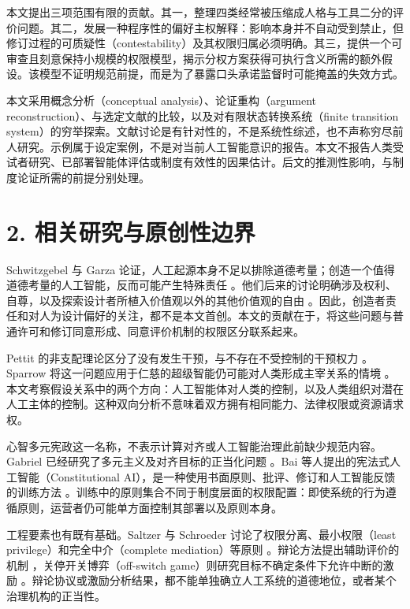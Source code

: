 \documentclass[11pt,a4paper,fontset=fandol]{ctexart}
\begin{document}
本文提出三项范围有限的贡献。其一，整理四类经常被压缩成人格与工具二分的评价问题。其二，发展一种程序性的偏好主权解释：影响本身并不自动受到禁止，但修订过程的可质疑性（contestability）及其权限归属必须明确。其三，提供一个可审查且刻意保持小规模的权限模型，揭示分权方案获得可执行含义所需的额外假设。该模型不证明规范前提，而是为了暴露口头承诺监督时可能掩盖的失效方式。

本文采用概念分析（conceptual analysis）、论证重构（argument reconstruction）、与选定文献的比较，以及对有限状态转换系统（finite transition system）的穷举探索。文献讨论是有针对性的，不是系统性综述，也不声称穷尽前人研究。示例属于设定案例，不是对当前人工智能意识的报告。本文不报告人类受试者研究、已部署智能体评估或制度有效性的因果估计。后文的推测性影响，与制度论证所需的前提分别处理。

\hypertarget{section-3}{%
\section{2. 相关研究与原创性边界}\label{section-3}}

Schwitzgebel 与 Garza 论证，人工起源本身不足以排除道德考量；创造一个值得道德考量的人工智能，反而可能产生特殊责任 \cite{ref-4}。他们后来的讨论明确涉及权利、自尊，以及探索设计者所植入价值观以外的其他价值观的自由 \cite{ref-5}。因此，创造者责任和对人为设计偏好的关注，都不是本文首创。本文的贡献在于，将这些问题与普通许可和修订同意形成、同意评价机制的权限区分联系起来。

Pettit 的非支配理论区分了没有发生干预，与不存在不受控制的干预权力 \cite{ref-6}。Sparrow 将这一问题应用于仁慈的超级智能仍可能对人类形成主宰关系的情境 \cite{ref-7}。本文考察假设关系中的两个方向：人工智能体对人类的控制，以及人类组织对潜在人工主体的控制。这种双向分析不意味着双方拥有相同能力、法律权限或资源请求权。

心智多元宪政这一名称，不表示计算对齐或人工智能治理此前缺少规范内容。Gabriel 已经研究了多元主义及对齐目标的正当化问题 \cite{ref-1}。Bai 等人提出的宪法式人工智能（Constitutional AI），是一种使用书面原则、批评、修订和人工智能反馈的训练方法 \cite{ref-9}。训练中的原则集合不同于制度层面的权限配置：即使系统的行为遵循原则，运营者仍可能单方面控制其部署以及原则本身。

工程要素也有既有基础。Saltzer 与 Schroeder 讨论了权限分离、最小权限（least privilege）和完全中介（complete mediation）等原则 \cite{ref-8}。辩论方法提出辅助评价的机制 \cite{ref-10}，关停开关博弈（off-switch game）则研究目标不确定条件下允许中断的激励 \cite{ref-11}。辩论协议或激励分析结果，都不能单独确立人工系统的道德地位，或者某个治理机构的正当性。
\end{document}
